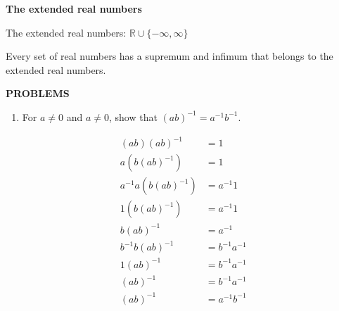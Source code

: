 \documentclass[a4paper,10pt]{book}
\theoremstyle{plain} %
\begin{document}
\begin{flushleft}
\medskip
\textbf{The extended real numbers}\par
The extended real numbers: $\mathbb{R} \cup \{-\infty,\infty\}$\par
Every set of real numbers has a supremum and infimum that belongs to the extended real numbers.

\end{flushleft}

\begin{center}
	\textbf{PROBLEMS}
\end{center}
\begin{enumerate}
	\setcounter{enumi}{0}
	\item For $a\neq 0$ and $a\neq 0$, show that $(ab)^{-1} = a^{-1}b^{-1}$.\par

		\begin{align*}
			(ab)(ab)^{-1} & = 1 && \tag*{by multiplicative inverse}\\
			a(b(ab)^{-1}) & = 1 && \tag*{by associativity of multiplication} \\
			a^{-1}a(b(ab)^{-1}) & = a^{-1}1 \\
			1(b(ab)^{-1}) & = a^{-1}1 && \tag*{by multiplicative inverse} \\
			b(ab)^{-1} & = a^{-1} && \tag*{by multiplicative identity} \\
			b^{-1}b(ab)^{-1} & = b^{-1}a^{-1} \\
			1(ab)^{-1} & = b^{-1}a^{-1} && \tag*{by multiplicative inverse} \\
			(ab)^{-1} & = b^{-1}a^{-1} && \tag*{by multiplicative identity} \\
			(ab)^{-1} & = a^{-1}b^{-1} && \tag*{by commutativity of multiplication} \\
		\end{align*}


\end{enumerate}
\end{document}
